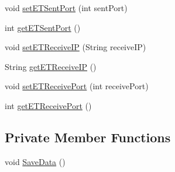 \begin{DoxyCompactItemize}
\item 
void \hyperlink{class_web_analyzer_1_1_u_i_1_1_interaction_objects_1_1_application_settings_obj_a095d468164bf3a15afb20263d5c4acc9}{set\+E\+T\+Sent\+Port} (int sent\+Port)
\item 
int \hyperlink{class_web_analyzer_1_1_u_i_1_1_interaction_objects_1_1_application_settings_obj_ab6c124b501ab3830c1ca44d03257ba3b}{get\+E\+T\+Sent\+Port} ()
\item 
void \hyperlink{class_web_analyzer_1_1_u_i_1_1_interaction_objects_1_1_application_settings_obj_afb010b22324d88dd1c3d51d710e3c8f2}{set\+E\+T\+Receive\+I\+P} (String receive\+I\+P)
\item 
String \hyperlink{class_web_analyzer_1_1_u_i_1_1_interaction_objects_1_1_application_settings_obj_a5d73249a3c35ae7c83fcf446db49af64}{get\+E\+T\+Receive\+I\+P} ()
\item 
void \hyperlink{class_web_analyzer_1_1_u_i_1_1_interaction_objects_1_1_application_settings_obj_acd7bd62bfa3f59a0ef1639d6c7252978}{set\+E\+T\+Receive\+Port} (int receive\+Port)
\item 
int \hyperlink{class_web_analyzer_1_1_u_i_1_1_interaction_objects_1_1_application_settings_obj_a03787263c42b3f67c0ce49a8d68919c0}{get\+E\+T\+Receive\+Port} ()
\end{DoxyCompactItemize}
\subsection*{Private Member Functions}
\begin{DoxyCompactItemize}
\item 
void \hyperlink{class_web_analyzer_1_1_u_i_1_1_interaction_objects_1_1_application_settings_obj_aaa5e35a08358da0c68958a15bd47bc57}{Save\+Data} ()
\end{DoxyCompactItemize}
